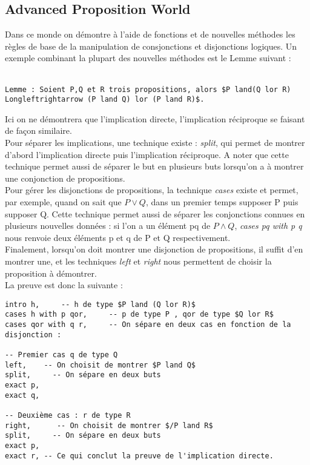 \subsection{Advanced Proposition World}
Dans ce monde on démontre à l'aide de fonctions et de nouvelles méthodes les règles de base de la manipulation de consjonctions et disjonctions logiques. Un exemple combinant la plupart des nouvelles méthodes est le Lemme suivant : \\
\\
\begin{verbatim}
Lemme : Soient P,Q et R trois propositions, alors $P land(Q lor R) Longleftrightarrow (P land Q) lor (P land R)$.
\end{verbatim}
Ici on ne démontrera que l'implication directe, l'implication réciproque se faisant de façon similaire.\\
Pour séparer les implications, une technique existe : \textit{split}, qui permet de montrer d'abord l'implication directe puis l'implication réciproque. A noter que cette technique permet aussi de séparer le but en plusieurs buts lorsqu'on a à montrer une conjonction de propositions.\\
Pour gérer les disjonctions de propositions, la technique \textit{cases} existe et permet, par exemple, quand on sait que $P\lor Q$, dans un premier temps supposer P puis supposer Q. Cette technique permet aussi de séparer les conjonctions connues en plusieurs nouvelles données : si l'on a un élément pq de $P\land Q$, \textit{cases pq with p q} nous renvoie deux éléments p et q de P et Q respectivement.\\
Finalement, lorsqu'on doit montrer une disjonction de propositions, il suffit d'en montrer une, et les techniques \textit{left} et \textit{right} nous permettent de choisir la proposition à démontrer.\\
La preuve est donc la suivante : \\
\begin{verbatim}
intro h,     -- h de type $P land (Q lor R)$
cases h with p qor,     -- p de type P , qor de type $Q lor R$
cases qor with q r,     -- On sépare en deux cas en fonction de la disjonction :

-- Premier cas q de type Q
left,    -- On choisit de montrer $P land Q$
split,     -- On sépare en deux buts
exact p,
exact q,

-- Deuxième cas : r de type R
right,      -- On choisit de montrer $/P land R$
split,     -- On sépare en deux buts
exact p,
exact r, -- Ce qui conclut la preuve de l'implication directe.
\end{verbatim}
